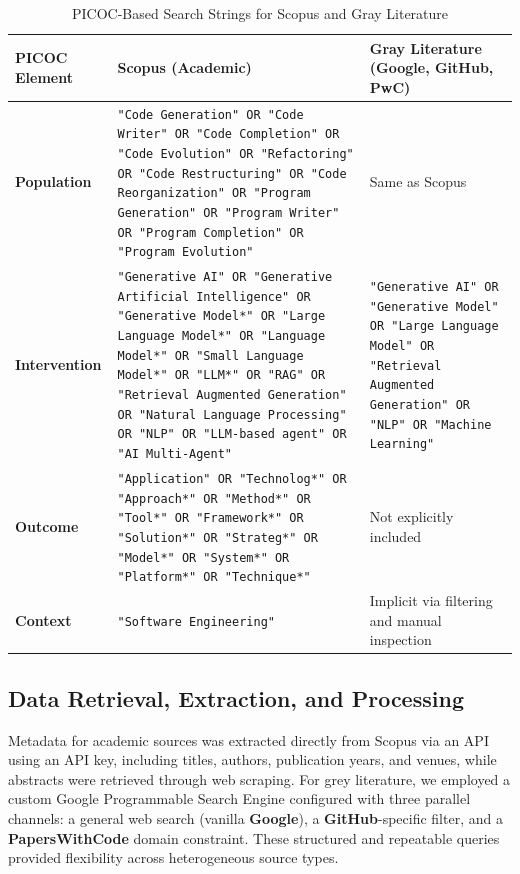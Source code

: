 \begin{table}[!ht]
  \small
  \centering
  \caption{PICOC-Based Search Strings for Scopus and Gray Literature}
  \begin{tabular}{p{3cm} p{6.5cm} p{6.5cm}}
\hline\hline
    \textbf{PICOC Element} & \textbf{Scopus (Academic)} & \textbf{Gray Literature (Google, GitHub, PwC)} \\
\hline%
    \textbf{Population} &
    \texttt{"Code Generation" OR "Code Writer" OR "Code Completion" OR "Code Evolution" OR "Refactoring" OR "Code Restructuring" OR "Code Reorganization" OR "Program Generation" OR "Program Writer" OR "Program Completion" OR "Program Evolution"} &
    Same as Scopus \\
    \textbf{Intervention} &
    \texttt{"Generative AI" OR "Generative Artificial Intelligence" OR "Generative Model*" OR "Large Language Model*" OR "Language Model*" OR "Small Language Model*" OR "LLM*" OR "RAG" OR "Retrieval Augmented Generation" OR "Natural Language Processing" OR "NLP" OR "LLM-based agent" OR "AI Multi-Agent"} &
    \texttt{"Generative AI" OR "Generative Model" OR "Large Language Model" OR "Retrieval Augmented Generation" OR "NLP" OR "Machine Learning"} \\
    \textbf{Outcome} &
    \texttt{"Application" OR "Technolog*" OR "Approach*" OR "Method*" OR "Tool*" OR "Framework*" OR "Solution*" OR "Strateg*" OR "Model*" OR "System*" OR "Platform*" OR "Technique*"} &
    Not explicitly included \\
    \textbf{Context} &
    \texttt{"Software Engineering"} &
    Implicit via filtering and manual inspection \\
\hline\hline
  \end{tabular}
  \label{tab:search-strings-picoc}
\end{table}





\subsection{Data Retrieval, Extraction, and Processing}

Metadata for academic sources was extracted directly from Scopus via an API using an API key, including titles, authors, publication years, and venues, while abstracts were retrieved through web scraping. For grey literature, we employed a custom Google Programmable Search Engine configured with three parallel channels: a general web search (vanilla \textbf{Google}), a \textbf{GitHub}-specific filter, and a \textbf{PapersWithCode} domain constraint. These structured and repeatable queries provided flexibility across heterogeneous source types.

